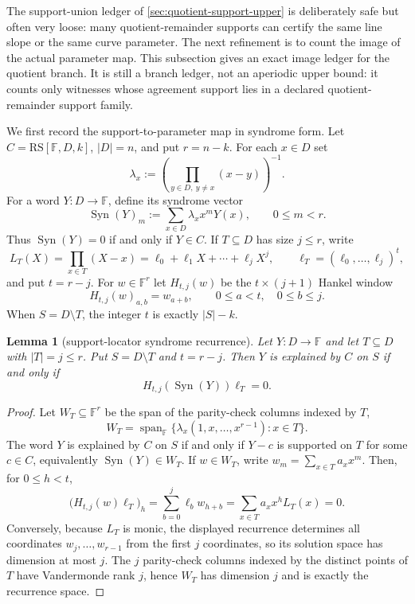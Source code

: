 \documentclass[11pt]{article}
\newtheorem{lemma}[theorem]{Lemma}
\theoremstyle{definition}
\theoremstyle{remark}
\newcommand{\F}{\mathbb{F}}
\newcommand{\RS}{\mathrm{RS}}
\newcommand{\Syn}{\operatorname{Syn}}
\begin{document}
The support-union ledger of \cref{sec:quotient-support-upper} is deliberately
safe but often very loose: many quotient-remainder supports can certify the same
line slope or the same curve parameter.  The next refinement is to count the
image of the actual parameter map.  This subsection gives an exact image ledger
for the quotient branch.  It is still a branch ledger, not an aperiodic upper
bound: it counts only witnesses whose agreement support lies in a declared
quotient-remainder support family.

We first record the support-to-parameter map in syndrome form.  Let
$C=\RS[\F,D,k]$, $|D|=n$, and put $r=n-k$.  For each $x\in D$ set
\[
        \lambda_x:=\left(\prod_{y\in D,\ y\ne x}(x-y)\right)^{-1}.
\]
For a word $Y:D\to\F$, define its syndrome vector
\[
        \Syn(Y)_m:=\sum_{x\in D}\lambda_x x^mY(x),
        \qquad 0\le m<r .
\]
Thus $\Syn(Y)=0$ if and only if $Y\in C$.  If
$T\subseteq D$ has size $j\le r$, write
\[
        L_T(X)=\prod_{x\in T}(X-x)=\ell_0+\ell_1X+\cdots+\ell_jX^j,
        \qquad
        \boldsymbol\ell_T=(\ell_0,\ldots,\ell_j)^t,
\]
and put $t=r-j$.  For $w\in\F^r$ let $H_{t,j}(w)$ be the $t\times(j+1)$ Hankel
window
\[
        H_{t,j}(w)_{a,b}=w_{a+b},
        \qquad 0\le a<t,\quad 0\le b\le j .
\]
When $S=D\setminus T$, the integer $t$ is exactly $|S|-k$.


\begin{lemma}[support-locator syndrome recurrence]
\label{lem:support-locator-syndrome-recurrence}
Let $Y:D\to\F$ and let $T\subseteq D$ with $|T|=j\le r$.  Put
$S=D\setminus T$ and $t=r-j$.  Then $Y$ is explained by $C$ on $S$ if and only if
\[
        H_{t,j}(\Syn(Y))\boldsymbol\ell_T=0 .
\]
\end{lemma}

\begin{proof}
Let $W_T\subseteq\F^r$ be the span of the parity-check columns indexed by $T$,
\[
        W_T=\operatorname{span}_\F\{\lambda_x(1,x,\ldots,x^{r-1}):x\in T\}.
\]
The word $Y$ is explained by $C$ on $S$ if and only if $Y-c$ is supported on $T$
for some $c\in C$, equivalently $\Syn(Y)\in W_T$.  If
$w\in W_T$, write $w_m=\sum_{x\in T}a_xx^m$.  Then, for $0\le h<t$,
\[
        \bigl(H_{t,j}(w)\boldsymbol\ell_T\bigr)_h
        =\sum_{b=0}^j\ell_b w_{h+b}
        =\sum_{x\in T}a_xx^hL_T(x)=0.
\]
Conversely, because $L_T$ is monic, the displayed recurrence determines all
coordinates $w_j,\ldots,w_{r-1}$ from the first $j$ coordinates, so its solution
space has dimension at most $j$.  The $j$ parity-check columns indexed by the
distinct points of $T$ have Vandermonde rank $j$, hence $W_T$ has dimension $j$
and is exactly the recurrence space.
\end{proof}
\end{document}
